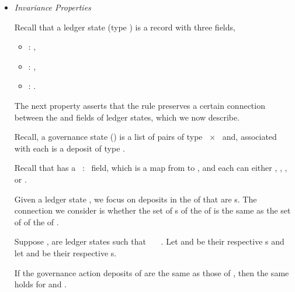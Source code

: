 \begin{itemize}
\item \textit{Invariance Properties}

        Recall that a ledger state (type \LState{}) is a record with three fields,
        \begin{itemize}
          \item[]  : \UTxOState{},
          \item[]  : \GovState{},
          \item[]  : \CertState{}.
        \end{itemize}
        The next property asserts that the  rule preserves a
        certain connection between the  and  fields of ledger
        states, which we now describe.

        Recall, a governance state (\GovState{}) is a list of pairs of type
        \GovActionID{}~×~\GovActionState{} and, associated with each
        \GovActionID{} is a deposit of type \GovActionDeposit{}.

        Recall that \UTxOState{} has a ~:~\Deposits{} field, which is a map
        from \DepositPurpose{} to \Coin{}, and each \DepositPurpose{} can either
        \CredentialDeposit{}, \PoolDeposit{}, \DRepDeposit{}, or \GovActionDeposit{}.

        Given a ledger state , we focus on deposits in the
        \UTxOState{} of  that are \GovActionDeposit{}s.  The connection we
        consider is whether the set of \GovActionDeposit{}s of the
        \UTxOState{} of  is the same as the set of \GovActionDeposit{} of the \GovState{}
        of .

  \begin{property}

  \vspace{-4mm}

  Suppose ,  are ledger states such that
   ~~~. Let 
  and  be their respective \UTxOState{}s and let 
  and  be their respective \GovState{}s.

  If the governance action deposits of  are the same as those
  of , then the same holds for  and .
  \end{property}


\end{itemize}
